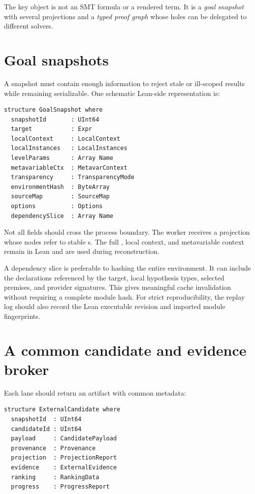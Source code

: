 \documentclass[11pt,letterpaper,openany]{report}
\newcommand{\code}[1]{\texttt{\detokenize{#1}}}
\begin{document}
The key object is not an SMT formula or a rendered term. It is a \emph{goal snapshot}
with several projections and a \emph{typed proof graph} whose holes can be delegated to
different solvers.

\section{Goal snapshots}

A snapshot must contain enough information to reject stale or ill-scoped results while
remaining serializable. One schematic Lean-side representation is:

\begin{lstlisting}[language=LeanFour,caption={Schematic Lean-owned goal snapshot}]
structure GoalSnapshot where
  snapshotId       : UInt64
  target           : Expr
  localContext     : LocalContext
  localInstances   : LocalInstances
  levelParams      : Array Name
  metavariableCtx  : MetavarContext
  transparency     : TransparencyMode
  environmentHash  : ByteArray
  sourceMap        : SourceMap
  options          : Options
  dependencySlice  : Array Name
\end{lstlisting}

Not all fields should cross the process boundary. The worker receives a projection
whose nodes refer to stable \code{SourceId}s. The full \code{Expr}, local context, and
metavariable context remain in Lean and are used during reconstruction.

A dependency slice is preferable to hashing the entire environment. It can include the
declarations referenced by the target, local hypothesis types, selected premises, and
provider signatures. This gives meaningful cache invalidation without requiring a
complete module hash. For strict reproducibility, the replay log should also record
the Lean executable revision and imported module fingerprints.

\section{A common candidate and evidence broker}

Each lane should return an artifact with common metadata:

\begin{lstlisting}[language=LeanFour,caption={Schematic common external result}]
structure ExternalCandidate where
  snapshotId  : UInt64
  candidateId : UInt64
  payload     : CandidatePayload
  provenance  : Provenance
  projection  : ProjectionReport
  evidence    : ExternalEvidence
  ranking     : RankingData
  progress    : ProgressReport
\end{lstlisting}
\end{document}
